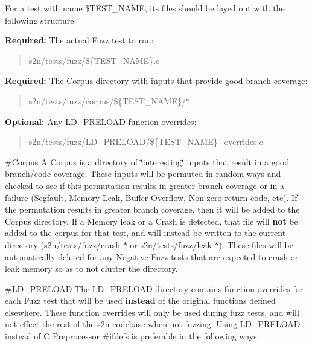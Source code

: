 For a test with name {\ttfamily \$\+T\+E\+S\+T\+\_\+\+N\+A\+ME}, its files should be layed out with the following structure\+:

{\bfseries Required\+:} The actual Fuzz test to run\+: \begin{quote}
{\ttfamily s2n/tests/fuzz/\$\{T\+E\+S\+T\+\_\+\+N\+A\+ME\}.c} \end{quote}


{\bfseries Required\+:} The Corpus directory with inputs that provide good branch coverage\+: \begin{quote}
{\ttfamily s2n/tests/fuzz/corpus/\$\{T\+E\+S\+T\+\_\+\+N\+A\+ME\}/$\ast$} \end{quote}


{\bfseries Optional\+:} Any {\ttfamily L\+D\+\_\+\+P\+R\+E\+L\+O\+AD} function overrides\+: \begin{quote}
{\ttfamily s2n/tests/fuzz/\+L\+D\+\_\+\+P\+R\+E\+L\+O\+A\+D/\$\{T\+E\+S\+T\+\_\+\+N\+A\+ME\}\+\_\+overrides.\+c} \end{quote}


\#\+Corpus A Corpus is a directory of \char`\"{}interesting\char`\"{} inputs that result in a good branch/code coverage. These inputs will be permuted in random ways and checked to see if this permutation results in greater branch coverage or in a failure (Segfault, Memory Leak, Buffer Overflow, Non-\/zero return code, etc). If the permutation results in greater branch coverage, then it will be added to the Corpus directory. If a Memory leak or a Crash is detected, that file will {\bfseries not} be added to the corpus for that test, and will instead be written to the current directory ({\ttfamily s2n/tests/fuzz/crash-\/$\ast$} or {\ttfamily s2n/tests/fuzz/leak-\/$\ast$}). These files will be automatically deleted for any Negative Fuzz tests that are expected to crash or leak memory so as to not clutter the directory.

\#\+L\+D\+\_\+\+P\+R\+E\+L\+O\+AD The {\ttfamily L\+D\+\_\+\+P\+R\+E\+L\+O\+AD} directory contains function overrides for each Fuzz test that will be used {\bfseries instead} of the original functions defined elsewhere. These function overrides will only be used during fuzz tests, and will not effect the rest of the s2n codebase when not fuzzing. Using {\ttfamily L\+D\+\_\+\+P\+R\+E\+L\+O\+AD} instead of C Preprocessor {\ttfamily \#ifdef}\textquotesingle{}s is preferable in the following ways\+:



